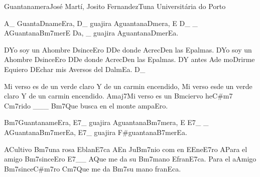 \begin{musica}{Guantanamera}{José Martí, Josito Fernandez}{Tuna Universitária do Porto}

\ac{A}{}_ Guanta\ac{D}{na}me\ac{E}{ra}, \ac{D}{}_ guajira \ac{A}{guan}tana\ac{D}{me}ra, \ac{E D}{}_ _
\ac{A}{Guan}tana\ac{Bm7}{me}r\ac{E D}{a}, _ guajira \ac{A}{guan}tana\ac{D}{me}r\ac{E}{a}.

\ac{D}{Yo} soy un \ac{A}{hom}bre \ac{D}{sin}ce\ac{E}{ro}
\ac{D}{De} donde \ac{A}{cre}c\ac{D}{en} las \ac{E}{pal}mas.
\ac{D}{Yo} soy un \ac{A}{hom}bre \ac{D}{sin}ce\ac{E}{ro}
\ac{D}{De} donde \ac{A}{cre}c\ac{D}{en} las \ac{E}{pal}mas.
\ac{D}{Y} antes \ac{A}{de} mo\ac{D}{rir}me \ac{E}{qui}ero
\ac{D}{E}char mis \ac{A}{ver}sos del \ac{D}{al}m\ac{E}{a}. \ac{D}{}_


Mi verso es de un verde claro
Y de un carmin encendido,
Mi verso esde un verde claro
Y de un carmin encendido.
\ac{Amaj7}{Mi} verso es un \ac{Bm}{cier}vo he\ac{C#m7 Cm7}{ri}do ___
\ac{Bm7}{Que} busca en el monte ampa\ac{E}{ro}.


\ac{Bm7}{Guan}taname\ac{E}{ra}, \ac{E7}{}_ guajira \ac{A}{guan}tana\ac{Bm7}{me}ra, \ac{E E7}{}_ _
\ac{A}{Guan}tana\ac{Bm7}{me}r\ac{E}{a}, \ac{E7}{}_ guajira \ac{F#}{guan}tana\ac{B7}{me}r\ac{E}{a}.

\ac{A}{Cu}ltivo \ac{Bm7}{una} rosa \ac{E}{bla}n\ac{E7}{ca}
\ac{A}{En} Ju\ac{Bm7}{nio} com en \ac{E}{E}ne\ac{E7}{ro}
\ac{A}{Pa}ra el amigo \ac{Bm7}{sin}ce\ac{E}{ro} \ac{E7}{}__
\ac{A}{Que} me da su \ac{Bm7}{ma}no \ac{E}{fra}n\ac{E7}{ca}.
Para el a\ac{A}{mi}go \ac{Bm7}{sin}ce\ac{C#m7}{ro}
\ac{Cm7}{Que} me da \ac{Bm7}{su} mano fran\ac{E}{ca}.

\end{musica}
